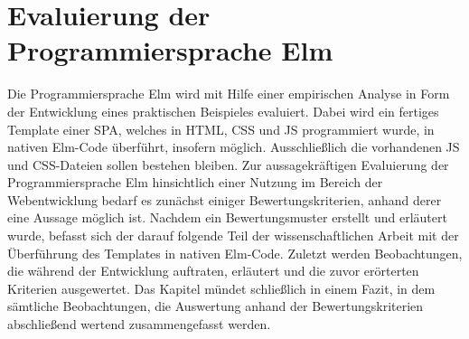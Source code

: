 \chapter{Evaluierung der Programmiersprache Elm}
\label{sec:Evaluierung der Programmiersprache Elm}
Die Programmiersprache Elm wird mit Hilfe einer empirischen Analyse in Form der Entwicklung eines praktischen Beispieles evaluiert. Dabei wird ein fertiges Template einer \ac{SPA}, welches in \ac{HTML}, \ac{CSS} und \ac{JS} programmiert wurde, in nativen Elm-Code überführt, insofern möglich. Ausschließlich die vorhandenen \ac{JS} und \ac{CSS}-Dateien sollen bestehen bleiben. Zur aussagekräftigen Evaluierung der Programmiersprache Elm hinsichtlich einer Nutzung im Bereich der Webentwicklung bedarf es zunächst einiger Bewertungskriterien, anhand derer eine Aussage möglich ist. Nachdem ein Bewertungsmuster erstellt und erläutert wurde, befasst sich der darauf folgende Teil der wissenschaftlichen Arbeit mit der Überführung des Templates in nativen Elm-Code. Zuletzt werden Beobachtungen, die während der Entwicklung auftraten, erläutert und die zuvor erörterten Kriterien ausgewertet. Das Kapitel mündet schließlich in einem Fazit, in dem sämtliche Beobachtungen, die Auswertung anhand der Bewertungskriterien abschließend wertend zusammengefasst werden.

